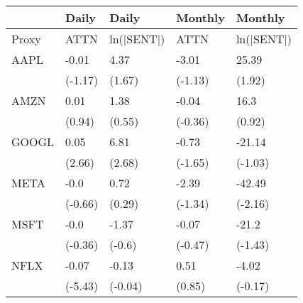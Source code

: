 \begin{tabular}{lllll}
\toprule
{} &    Daily &       Daily &  Monthly &     Monthly \\
\midrule
Proxy &     ATTN &  ln(|SENT|) &     ATTN &  ln(|SENT|) \\
AAPL  &    -0.01 &        4.37 &    -3.01 &       25.39 \\
      &  (-1.17) &      (1.67) &  (-1.13) &      (1.92) \\
AMZN  &     0.01 &        1.38 &    -0.04 &        16.3 \\
      &   (0.94) &      (0.55) &  (-0.36) &      (0.92) \\
GOOGL &     0.05 &        6.81 &    -0.73 &      -21.14 \\
      &   (2.66) &      (2.68) &  (-1.65) &     (-1.03) \\
META  &     -0.0 &        0.72 &    -2.39 &      -42.49 \\
      &  (-0.66) &      (0.29) &  (-1.34) &     (-2.16) \\
MSFT  &     -0.0 &       -1.37 &    -0.07 &       -21.2 \\
      &  (-0.36) &      (-0.6) &  (-0.47) &     (-1.43) \\
NFLX  &    -0.07 &       -0.13 &     0.51 &       -4.02 \\
      &  (-5.43) &     (-0.04) &   (0.85) &     (-0.17) \\
\bottomrule
\end{tabular}
